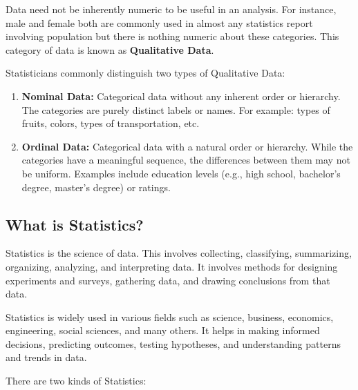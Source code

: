 \documentclass{article}
\begin{document}
            \noindent Data need not be inherently numeric to be useful in an analysis. For instance, male and female both are commonly used in almost any statistics report involving population but there is nothing numeric about these categories. This category of data is known as \textbf{Qualitative Data}.
            \bigskip
        
            \noindent Statisticians commonly distinguish two types of Qualitative Data:
            \begin{enumerate}
                \item \textbf{Nominal Data:} Categorical data without any inherent order or hierarchy. The categories are purely distinct labels or names. For example: types of fruits, colors, types of transportation, etc.
                
                \item \textbf{Ordinal Data:} Categorical data with a natural order or hierarchy. While the categories have a meaningful sequence, the differences between them may not be uniform. Examples include education  levels (e.g., high school, bachelor's degree, master's degree) or ratings.
                
            \end{enumerate}
            
        \subsection{What is Statistics?}

        Statistics is the science of data. This involves collecting, classifying, summarizing, organizing, analyzing, and interpreting data. It involves methods for designing experiments and surveys, gathering data, and drawing conclusions from that data.  

        \noindent Statistics is widely used in various fields such as science, business, economics, engineering, social sciences, and many others. It helps in making informed decisions, predicting outcomes, testing hypotheses, and understanding patterns and trends in data.

        \noindent There are two kinds of Statistics:
\end{document}
